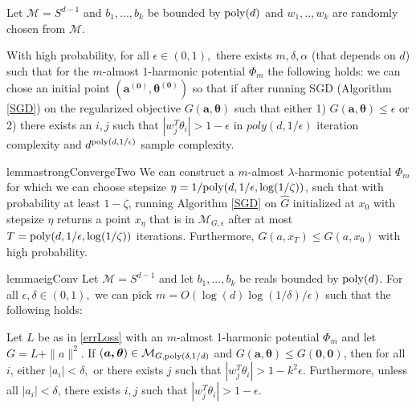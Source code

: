 %
\begin{theorem}\label{eigSGD}
  Let $\mathcal{M} = S^{d-1}$ and $b_1,...,b_k$ be bounded by $\mathrm{poly}(d)$ and $w_1,..,w_k$ are randomly chosen from $\mathcal{M}$.  

  With high probability, for all $\epsilon \in (0,1),$ there exists $m, \delta, \alpha$ (that depends on $d$) such that for the $m$-almost $1$-harmonic potential $\Phi_m$ the
  following holds: we can chose an initial point $(\boldsymbol{a^{(0)}, \theta^{(0)}})$ so that if after running SGD (Algorithm \ref{SGD}) on the regularized objective
  $G(\boldsymbol{a,\theta})$ such that either 1) $G(\boldsymbol{a,\theta}) \leq \epsilon$ or 2) there exists an $i, j$ such that $|w_j^T\theta_i| > 1- \epsilon$ in $poly(d,1/\epsilon)$ iteration complexity and $d^{\mathrm{poly}(d, 1/\epsilon)}$ sample complexity.
\end{theorem}
%
%
%
%
\begin{restatable}{lemma}{strongConvergeTwo}\label{strongConvergeTwo}  
We can construct a $m$-almost $\lambda$-harmonic potential $\Phi_m$ for which
we can choose stepsize $\eta = 1/\mathrm{poly}(d,1/\epsilon,\log(1/\zeta))$, such that with probability at least $1-\zeta$, running Algorithm \ref{SGD} on $\widehat{G}$ initialized at $x_0$ with stepsize $\eta$  returns a point $x_\eta$ that is in $\mathcal{M}_{G, \epsilon}$ after at most $T = \mathrm{poly}(d,1/\epsilon, \log(1/\zeta))$ iterations. 
 Furthermore, $G(a,x_T) \leq G(a, x_0)$ with high probability. 
\end{restatable}
%
\begin{restatable}{lemma}{eigConv}
\label{eigConv}
Let $\mathcal{M} = S^{d-1}$ and let $b_1,...,b_k$ be reals bounded by
$\mathrm{poly}(d)$. For all $\epsilon,\delta \in (0,1),$ we can pick
$m = O(\log(d)\log(1/\delta)/\epsilon)$ such that the following holds:

Let $L$ be as in \eqref{errLoss} with an $m$-almost 1-harmonic
potential $\Phi_m$ and let $G = L + \|a\|^2$.  If
$(\boldsymbol{a,\theta}) \in \mathcal{M}_{G, \mathrm{poly}(\delta,1/d)}$ and
$G(\boldsymbol{a,\theta}) \leq G(\boldsymbol{0, 0})$, then for all
$i$, either $|a_i| < \delta,$ or there exists $j$ such that
$|w_j^T\theta_i| > 1- k^2\epsilon.$ Furthermore,
unless all $|a_i| <\delta$, there exists $i, j$ such that
$|w_j^T\theta_i| > 1-\epsilon$.
\end{restatable}
%
